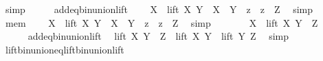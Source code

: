 \begin{isabellebody}
\ simp\isanewline
\ \ \isamarkupfalse%
\ \isamarkupfalse%
\ add{\isacharunderscore}{\kern0pt}eq{\isacharunderscore}{\kern0pt}bin{\isacharunderscore}{\kern0pt}union{\isacharunderscore}{\kern0pt}lift\ \isamarkupfalse%
\ {\isachardoublequoteopen}{\isachardot}{\kern0pt}{\isachardot}{\kern0pt}{\isachardot}{\kern0pt}\ {\isacharequal}{\kern0pt}\ X\ {\isasymunion}\ {\isacharparenleft}{\kern0pt}lift\ X\ Y{\isacharparenright}{\kern0pt}\ {\isasymunion}\ {\isacharbraceleft}{\kern0pt}{\isacharparenleft}{\kern0pt}X\ {\isacharplus}{\kern0pt}\ Y{\isacharparenright}{\kern0pt}\ {\isacharplus}{\kern0pt}\ z\ {\isacharbar}{\kern0pt}\ z\ {\isasymin}\ Z{\isacharbraceright}{\kern0pt}{\isachardoublequoteclose}\ \isamarkupfalse%
\ simp\isanewline
\ \ \isamarkupfalse%
\ \isamarkupfalse%
\ mem\ \isamarkupfalse%
\ {\isachardoublequoteopen}{\isachardot}{\kern0pt}{\isachardot}{\kern0pt}{\isachardot}{\kern0pt}\ {\isacharequal}{\kern0pt}\ X\ {\isasymunion}\ {\isacharparenleft}{\kern0pt}lift\ X\ Y{\isacharparenright}{\kern0pt}\ {\isasymunion}\ {\isacharbraceleft}{\kern0pt}X\ {\isacharplus}{\kern0pt}\ {\isacharparenleft}{\kern0pt}Y\ {\isacharplus}{\kern0pt}\ z{\isacharparenright}{\kern0pt}\ {\isacharbar}{\kern0pt}\ z\ {\isasymin}\ Z{\isacharbraceright}{\kern0pt}{\isachardoublequoteclose}\ \isamarkupfalse%
\ simp\isanewline
\ \ \isamarkupfalse%
\ \isamarkupfalse%
\ {\isachardoublequoteopen}{\isachardot}{\kern0pt}{\isachardot}{\kern0pt}{\isachardot}{\kern0pt}\ {\isacharequal}{\kern0pt}\ X\ {\isasymunion}\ lift\ X\ {\isacharparenleft}{\kern0pt}Y\ {\isacharplus}{\kern0pt}\ Z{\isacharparenright}{\kern0pt}{\isachardoublequoteclose}\isanewline
\ \ \isamarkupfalse%
{\isacharminus}{\kern0pt}\isanewline
\ \ \ \ \isamarkupfalse%
\ add{\isacharunderscore}{\kern0pt}eq{\isacharunderscore}{\kern0pt}bin{\isacharunderscore}{\kern0pt}union{\isacharunderscore}{\kern0pt}lift\ \isamarkupfalse%
\ {\isachardoublequoteopen}lift\ X\ {\isacharparenleft}{\kern0pt}Y\ {\isacharplus}{\kern0pt}\ Z{\isacharparenright}{\kern0pt}\ {\isacharequal}{\kern0pt}\ lift\ X\ {\isacharparenleft}{\kern0pt}Y\ {\isasymunion}\ lift\ Y\ Z{\isacharparenright}{\kern0pt}{\isachardoublequoteclose}\ \isamarkupfalse%
\ simp\isanewline
\ \ \ \ \isamarkupfalse%
\ \isamarkupfalse%
\ lift{\isacharunderscore}{\kern0pt}bin{\isacharunderscore}{\kern0pt}union{\isacharunderscore}{\kern0pt}eq{\isacharunderscore}{\kern0pt}lift{\isacharunderscore}{\kern0pt}bin{\isacharunderscore}{\kern0pt}union{\isacharunderscore}{\kern0pt}lift\ \isamarkupfalse%

\end{isabellebody}

